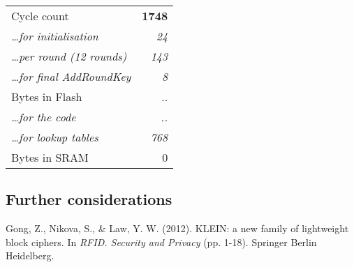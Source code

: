 \documentclass[a4paper]{article}
\begin{document}
\begin{center}
	\begin{tabular}{l r}
		\hline
		Cycle count & \textbf{1748} \\
		\hspace{1em} \emph{\dots for initialisation} & \emph{24} \\
		\hspace{1em} \emph{\dots per round (12 rounds)} & \emph{143} \\
		\hspace{1em} \emph{\dots for final AddRoundKey} & \emph{8} \\
		\hline
		Bytes in Flash & .. \\
		\hspace{1em} \emph{\dots for the code} & \emph{..} \\
		\hspace{1em} \emph{\dots for lookup tables} & \emph{768} \\
		\hline
		Bytes in SRAM & 0 \\
		\hline
	\end{tabular}
\end{center}

\subsection*{Further considerations}

\begin{thebibliography}{1}

 Gong, Z., Nikova, S., \& Law, Y. W. (2012). KLEIN: a new family of lightweight block ciphers. In \emph{RFID. Security and Privacy} (pp. 1-18). Springer Berlin Heidelberg.

\end{thebibliography}
\end{document}
